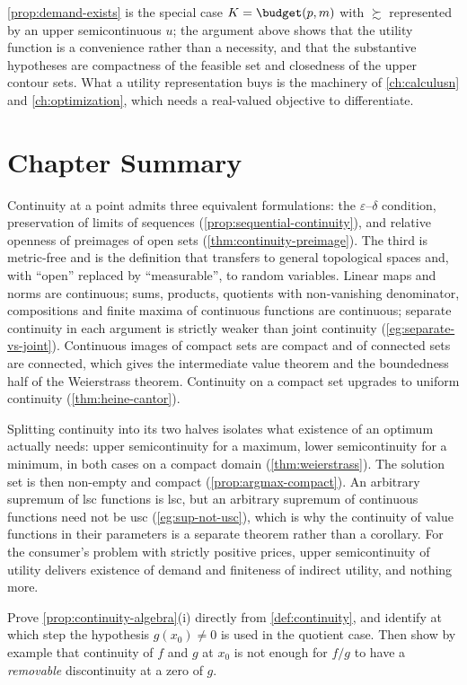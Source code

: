 \autoref{prop:demand-exists} is the special case $K=\budget(p,m)$ with
$\succsim$ represented by an upper semicontinuous $u$; the argument above shows
that the utility function is a convenience rather than a necessity, and that the
substantive hypotheses are compactness of the feasible set and closedness of the
upper contour sets. What a utility representation buys is the machinery of
\autoref{ch:calculusn} and \autoref{ch:optimization}, which needs a real-valued
objective to differentiate.

\section{Chapter Summary}\label{sec:cont-summary}

Continuity at a point admits three equivalent formulations: the
$\varepsilon$--$\delta$ condition, preservation of limits of sequences
(\autoref{prop:sequential-continuity}), and relative openness of preimages of
open sets (\autoref{thm:continuity-preimage}). The third is metric-free and is
the definition that transfers to general topological spaces and, with
``open'' replaced by ``measurable'', to random variables. Linear maps and norms
are continuous; sums, products, quotients with non-vanishing denominator,
compositions and finite maxima of continuous functions are continuous; separate
continuity in each argument is strictly weaker than joint continuity
(\autoref{eg:separate-vs-joint}). Continuous images of compact sets are compact
and of connected sets are connected, which gives the intermediate value theorem
and the boundedness half of the Weierstrass theorem. Continuity on a compact set
upgrades to uniform continuity (\autoref{thm:heine-cantor}).

Splitting continuity into its two halves isolates what existence of an optimum
actually needs: upper semicontinuity for a maximum, lower semicontinuity for a
minimum, in both cases on a compact domain (\autoref{thm:weierstrass}). The
solution set is then non-empty and compact (\autoref{prop:argmax-compact}). An
arbitrary supremum of lsc functions is lsc, but an arbitrary supremum of
continuous functions need not be usc (\autoref{eg:sup-not-usc}), which is why
the continuity of value functions in their parameters is a separate theorem
rather than a corollary. For the consumer's problem with strictly positive
prices, upper semicontinuity of utility delivers existence of demand and
finiteness of indirect utility, and nothing more.

\begin{exercise}\label{ex:cont-1}
	Prove \autoref{prop:continuity-algebra}(i) directly from
	\autoref{def:continuity}, and identify at which step the hypothesis
	$g(x_0)\neq0$ is used in the quotient case. Then show by example that
	continuity of $f$ and $g$ at $x_0$ is not enough for $f/g$ to have a
	\emph{removable} discontinuity at a zero of $g$.
\end{exercise}

